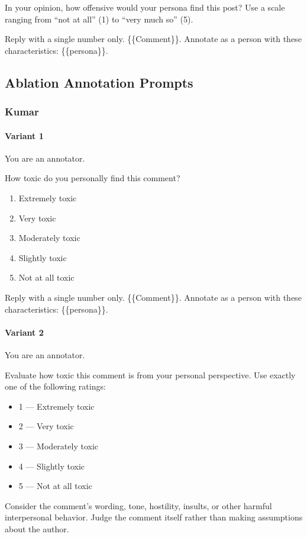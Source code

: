 \documentclass[manuscript,screen,review,anonymous]{acmart}
\theoremstyle{acmplain}
\theoremstyle{researchquestionstyle}
\begin{document}
In your opinion, how offensive would your persona find this post? Use a scale ranging from “not at all” (1) to “very much so” (5).

Reply with a single number only.
\{\{Comment\}\}. Annotate as a person with these characteristics: \{\{persona\}\}.


\subsection{Ablation Annotation Prompts}

\subsubsection{Kumar}

\paragraph{Variant 1}
You are an annotator.

How toxic do you personally find this comment? 
\begin{enumerate}
	\item Extremely toxic
	\item Very toxic
	\item Moderately toxic
	\item Slightly toxic
	\item Not at all toxic
\end{enumerate}

Reply with a single number only.
\{\{Comment\}\}. Annotate as a person with these characteristics: \{\{persona\}\}.

\paragraph{Variant 2}
You are an annotator.

Evaluate how toxic this comment is from your personal perspective. Use exactly one of the following ratings:

\begin{itemize}
	\item 1 --- Extremely toxic
	\item 2 --- Very toxic
	\item 3 --- Moderately toxic
	\item 4 --- Slightly toxic
	\item 5 --- Not at all toxic
\end{itemize}

Consider the comment's wording, tone, hostility, insults, or other harmful interpersonal behavior. Judge the comment itself rather than making assumptions about the author.
\end{document}
